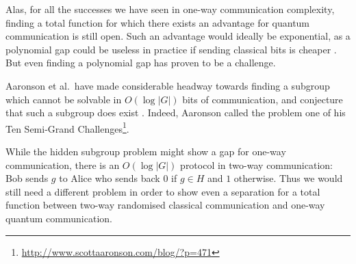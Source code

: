 \documentclass[a4paper]{article}
\begin{document}
        Alas, for all the successes we have seen in one-way communication complexity, finding a total function for which there exists an advantage for quantum communication is still open. Such an advantage would ideally be exponential, as a polynomial gap could be useless in practice if sending classical bits is cheaper \cite{RevModPhys.82.665}. But even finding a polynomial gap has proven to be a challenge.

        Aaronson et al.\ have made considerable headway towards finding a subgroup which cannot be solvable in $O(\log |G|)$ bits of communication, and conjecture that such a subgroup does exist \cite{0902.3175}. Indeed, Aaronson called the problem one of his Ten Semi-Grand Challenges\footnote{\url{http://www.scottaaronson.com/blog/?p=471}}.

        While the hidden subgroup problem might show a gap for one-way communication, there is an $O(\log|G|)$ protocol in two-way communication: Bob sends $g$ to Alice who sends back $0$ if $g \in H$ and $1$ otherwise. Thus we would still need a different problem in order to show even a separation for a total function between two-way randomised classical communication and one-way quantum communication.

    
    {}
\end{document}
